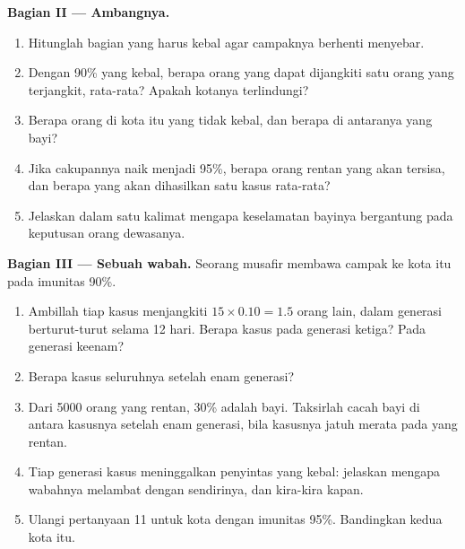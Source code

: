 \begin{problem}
\medskip
\noindent\textbf{Bagian II --- Ambangnya.}
\begin{enumerate}[resume]
  \item Hitunglah bagian  yang harus kebal agar campaknya
        berhenti menyebar.
  \item Dengan 90\% yang kebal, berapa orang yang dapat dijangkiti satu
        orang yang terjangkit, rata-rata? Apakah kotanya terlindungi?
  \item Berapa orang di kota itu yang tidak kebal, dan berapa di
        antaranya yang bayi?
  \item Jika cakupannya naik menjadi 95\%, berapa orang rentan yang
        akan tersisa, dan berapa yang akan dihasilkan satu kasus
        rata-rata?
  \item Jelaskan dalam satu kalimat mengapa keselamatan bayinya
        bergantung pada keputusan orang dewasanya.
\end{enumerate}

\medskip
\noindent\textbf{Bagian III --- Sebuah wabah.}
Seorang musafir membawa campak ke kota itu pada imunitas 90\%.
\begin{enumerate}[resume]
  \item Ambillah tiap kasus menjangkiti $15 \times 0.10 = 1.5$ orang
        lain, dalam generasi berturut-turut selama 12 hari. Berapa
        kasus pada generasi ketiga? Pada generasi keenam?
  \item Berapa kasus seluruhnya setelah enam generasi?
  \item Dari 5000 orang yang rentan, 30\% adalah bayi. Taksirlah cacah
        bayi di antara kasusnya setelah enam generasi, bila kasusnya
        jatuh merata pada yang rentan.
  \item Tiap generasi kasus meninggalkan penyintas yang kebal:
        jelaskan mengapa wabahnya melambat dengan sendirinya, dan
        kira-kira kapan.
  \item Ulangi pertanyaan 11 untuk kota dengan imunitas 95\%.
        Bandingkan kedua kota itu.
\end{enumerate}


\end{problem}
